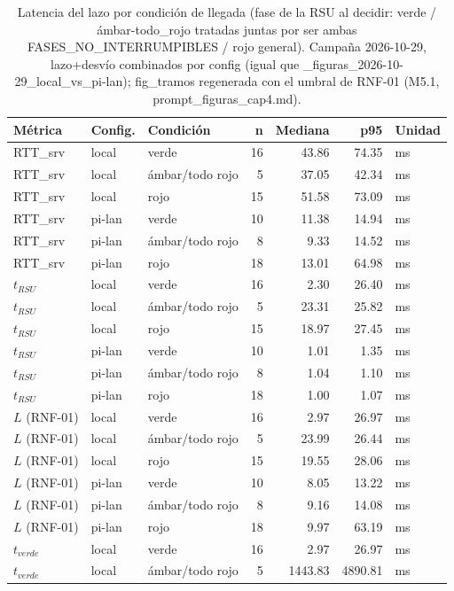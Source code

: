 \begin{table}[H]
\centering
\caption{Latencia del lazo por condición de llegada (fase de la RSU al decidir: verde / ámbar-todo\_rojo tratadas juntas por ser ambas FASES\_NO\_INTERRUMPIBLES / rojo general). Campaña 2026-10-29, lazo+desvío combinados por config (igual que _figuras_2026-10-29_local_vs_pi-lan); fig_tramos regenerada con el umbral de RNF-01 (M5.1, prompt_figuras_cap4.md).}
\label{tab:latencia_por_condicion}
\small
\begin{tabular}{lllrrrl}
\toprule
\textbf{Métrica} & \textbf{Config.} & \textbf{Condición} & \textbf{n} & \textbf{Mediana} & \textbf{p95} & \textbf{Unidad} \\
\midrule
RTT\_srv & local & verde & 16 & 43.86 & 74.35 & ms \\
RTT\_srv & local & ámbar/todo rojo & 5 & 37.05 & 42.34 & ms \\
RTT\_srv & local & rojo & 15 & 51.58 & 73.09 & ms \\
RTT\_srv & pi-lan & verde & 10 & 11.38 & 14.94 & ms \\
RTT\_srv & pi-lan & ámbar/todo rojo & 8 & 9.33 & 14.52 & ms \\
RTT\_srv & pi-lan & rojo & 18 & 13.01 & 64.98 & ms \\
$t_{RSU}$ & local & verde & 16 & 2.30 & 26.40 & ms \\
$t_{RSU}$ & local & ámbar/todo rojo & 5 & 23.31 & 25.82 & ms \\
$t_{RSU}$ & local & rojo & 15 & 18.97 & 27.45 & ms \\
$t_{RSU}$ & pi-lan & verde & 10 & 1.01 & 1.35 & ms \\
$t_{RSU}$ & pi-lan & ámbar/todo rojo & 8 & 1.04 & 1.10 & ms \\
$t_{RSU}$ & pi-lan & rojo & 18 & 1.00 & 1.07 & ms \\
$L$ (RNF-01) & local & verde & 16 & 2.97 & 26.97 & ms \\
$L$ (RNF-01) & local & ámbar/todo rojo & 5 & 23.99 & 26.44 & ms \\
$L$ (RNF-01) & local & rojo & 15 & 19.55 & 28.06 & ms \\
$L$ (RNF-01) & pi-lan & verde & 10 & 8.05 & 13.22 & ms \\
$L$ (RNF-01) & pi-lan & ámbar/todo rojo & 8 & 9.16 & 14.08 & ms \\
$L$ (RNF-01) & pi-lan & rojo & 18 & 9.97 & 63.19 & ms \\
$t_{verde}$ & local & verde & 16 & 2.97 & 26.97 & ms \\
$t_{verde}$ & local & ámbar/todo rojo & 5 & 1443.83 & 4890.81 & ms \\

\end{tabular}
\end{table}
